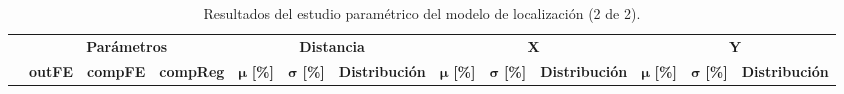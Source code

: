 \begin{table}[H]
    \centering
    \caption{Resultados del estudio paramétrico del modelo de localización (2 de 2).}
        \label{tab:Results_XY_2}
        \resizebox{23cm}{!} {
        {\renewcommand{\arraystretch}{1.2}
        
        
    \begin{tabular}{|r|r|r|r|l|l|l|l|l|l|l|l|l|}
    \hline
    \rowcolor[HTML]{C0C0C0} 
    \multicolumn{1}{|c|}{\cellcolor[HTML]{C0C0C0}} & 
    \multicolumn{3}{c|}{\cellcolor[HTML]{C0C0C0}\textbf{Parámetros}} & 
    \multicolumn{3}{c|}{\cellcolor[HTML]{C0C0C0}\textbf{Distancia}} & 
    \multicolumn{3}{c|}{\cellcolor[HTML]{C0C0C0}\textbf{X}} &
    \multicolumn{3}{c|}{\cellcolor[HTML]{C0C0C0}\textbf{Y}} 
    
    \\ \cline{2-13} 
    
    \rowcolor[HTML]{EFEFEF} 
    \multicolumn{1}{|c|}{\multirow{-2}{*}{\cellcolor[HTML]{C0C0C0}Id}} & 
    \multicolumn{1}{c|}{\cellcolor[HTML]{EFEFEF}\textbf{outFE}} & 
    \multicolumn{1}{c|}{\cellcolor[HTML]{EFEFEF}\textbf{compFE}} & 
    \multicolumn{1}{c|}{\cellcolor[HTML]{EFEFEF}\textbf{compReg}} & 
    \multicolumn{1}{c|}{\cellcolor[HTML]{EFEFEF}$\bm{\mu}$ \textbf{[\%]}} & 
    \multicolumn{1}{c|}{\cellcolor[HTML]{EFEFEF}$\bm{\sigma}$ \textbf{[\%]}} & 
    \multicolumn{1}{c|}{\cellcolor[HTML]{EFEFEF}\textbf{Distribución}} & 
    \multicolumn{1}{c|}{\cellcolor[HTML]{EFEFEF}$\bm{\mu}$ \textbf{[\%]}} & 
    \multicolumn{1}{c|}{\cellcolor[HTML]{EFEFEF}$\bm{\sigma}$ \textbf{[\%]}} & 
    \multicolumn{1}{c|}{\cellcolor[HTML]{EFEFEF}\textbf{Distribución}} & 
    \multicolumn{1}{c|}{\cellcolor[HTML]{EFEFEF}$\bm{\mu}$ \textbf{[\%]}} & 
    \multicolumn{1}{c|}{\cellcolor[HTML]{EFEFEF}$\bm{\sigma}$ \textbf{[\%]}} & 
    \multicolumn{1}{c|}{\cellcolor[HTML]{EFEFEF}\textbf{Distribución}} \\ \hline
    

\end{tabular}}}
\end{table}
